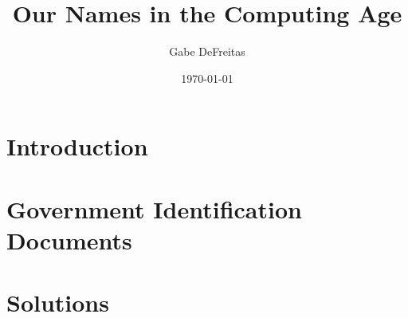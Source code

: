 \documentclass{report}
\title{Our Names in the Computing Age}
\author{Gabe DeFreitas}
\date{\today}
\begin{document}
\maketitle
\tableofcontents

\chapter{Introduction}





\chapter{Government Identification Documents}





\chapter{Solutions}

\printbibliography
\end{document}
